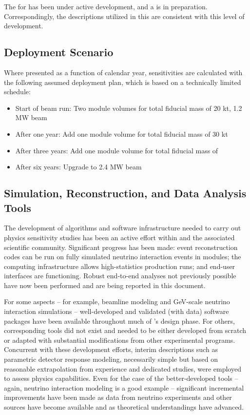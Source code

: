 The  for  has been under active development,
and a  is in preparation.
Correspondingly, the descriptions utilized in this 
are consistent with this level of development.  

\subsection{Deployment Scenario}
\label{sec:exec-phys-assm-meth-deployment}

Where presented as a function of calendar year,
sensitivities are calculated with the following
assumed deployment plan, which is based on a
technically limited schedule:
\begin{itemize}
    \item Start of beam run: Two  module %
    volumes for total fiducial mass of 20 kt, 1.2 MW beam
    \item After one year: Add one  module  volume for total fiducial mass of 30 kt
    \item After three years: Add one  module  volume for total fiducial mass of \fdfiducialmass
    \item After six years: Upgrade to 2.4 MW beam
\end{itemize}


\subsection{Simulation, Reconstruction, and Data Analysis Tools}
\label{sec:exec-phys-assm-meth-simreco}

The development of algorithms and software infrastructure needed
to carry out physics sensitivity studies has been an active 
effort within  and the associated scientific community.  
Significant progress has been made: event reconstruction 
codes can be run on fully simulated neutrino interaction events 
in   modules; the  computing infrastructure 
allows high-statistics production runs; and end-user interfaces 
are functioning.  Robust end-to-end analyses not previously
possible have now been performed and are being 
reported in this document.

For some aspects -- for example, beamline modeling
and GeV-scale neutrino interaction simulations --
well-developed and validated (with data) software packages have
been available throughout much of 's design phase.
For others, corresponding tools did not exist and needed to be
either developed from scratch or adapted with substantial
modifications from other experimental programs.  Concurrent
with these development efforts, interim descriptions such
as parametric detector response modeling, necessarily simple
but based on reasonable extrapolation from experience and
dedicated studies, were employed to assess physics capabilities.
Even for the case of the better-developed tools -- again, neutrino 
interaction modeling is a good example -- significant incremental
improvements have been made as data from neutrino experiments
and other sources have become available and as theoretical
understandings have advanced.

